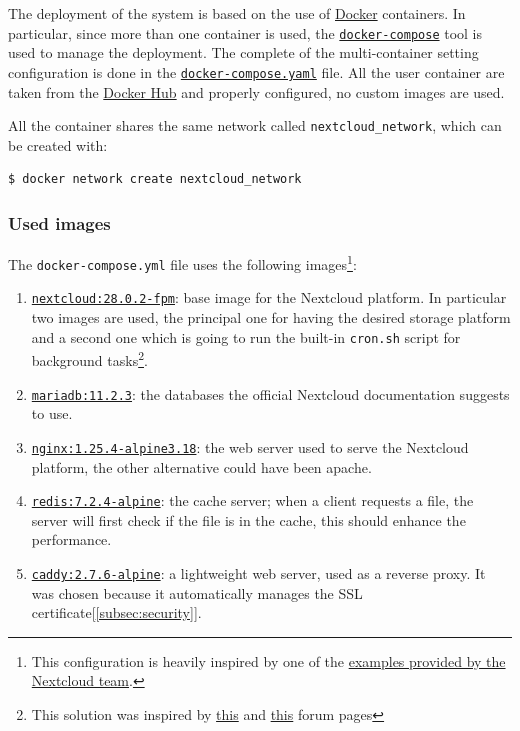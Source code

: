 The deployment of the system is based on the use of \href{https://www.docker.com/}{Docker} containers.
In particular, since more than one container is used, the \href{https://docs.docker.com/compose/}{\texttt{docker-compose}} tool is used to manage the deployment.
The complete of the multi-container setting configuration is done in the \href{https://github.com/IsacPasianotto/cloud-computing-assignment/blob/main/exercise01/docker-compose.yaml}{\texttt{docker-compose.yaml}} file.
All the user container are taken from the \href{https://hub.docker.com/}{Docker Hub} and properly configured, no custom images are used.

All the container shares the same network called \texttt{nextcloud\_network}, which can be created with:

\begin{lstlisting}[language=bash]
$ docker network create nextcloud_network
\end{lstlisting}

\subsubsection{Used images}
The \texttt{docker-compose.yml} file uses the following images\footnote{This configuration is heavily inspired by one of the \href{https://github.com/nextcloud/docker/blob/master/.examples/docker-compose/with-nginx-proxy/mariadb/fpm/docker-compose.yml}{examples provided by the Nextcloud team}.}:

\begin{enumerate}
    \itemsep0em
    \item \href{https://hub.docker.com/layers/library/nextcloud/28.0.2-fpm/images/sha256-dc1b232c39cd29fe81442f0e4d1c523148afecaf0bcf1cdffb7c52441bf63af7?context=explore}{\texttt{nextcloud:28.0.2-fpm}}: 
    base image for the Nextcloud platform. In particular two images are used, the principal one for having the desired storage platform and a second one which is going to run the built-in \texttt{cron.sh}  script for background tasks\footnote{This solution was inspired by \href{https://help.nextcloud.com/t/nextcloud-docker-container-best-way-to-run-cron-job/157734/2}{this} and \href{https://help.nextcloud.com/t/clarification-regarding-cron-jobs-setup-config/134450}{this} forum pages}.
    \item \href{https://hub.docker.com/_/mariadb}{\texttt{mariadb:11.2.3}}: the databases the official Nextcloud documentation suggests to use. 
    \item \href{https://hub.docker.com/_/nginx}{\texttt{nginx:1.25.4-alpine3.18}}: the web server used to serve the Nextcloud platform, the other alternative could have been apache.
    \item \href{https://hub.docker.com/_/redis}{\texttt{redis:7.2.4-alpine}}: the cache server; when a client requests a file, the server will first check if the file is in the cache, this should enhance the performance.
    \item \href{https://hub.docker.com/_/caddy}{\texttt{caddy:2.7.6-alpine}}: a lightweight web server, used as a reverse proxy. It was chosen because it automatically manages the SSL certificate[\ref{subsec:security}].
\end{enumerate}

